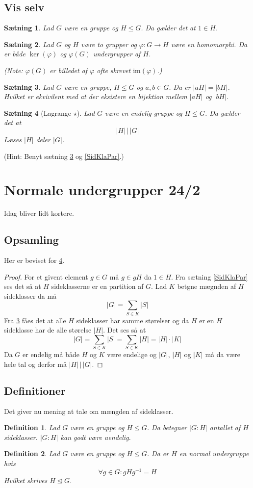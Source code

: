 \documentclass{article}
\newcommand{\inv}{^{-1}}
\newcommand{\too}{\rightarrow}
\newtheorem{setn}{Sætning}
\newtheorem{defi}{Definition}
\begin{document}
		\subsection*{Vis selv}
		\begin{setn}
			Lad $G$ være en gruppe og $H \le G$. Da gælder det at $1 \in H$.
		\end{setn}
		\begin{setn}
			Lad $G$ og $H$ være to grupper og $\varphi: G \too H$ være en homomorphi.
			Da er både $\ker(\varphi)$ og $\varphi(G)$ undergrupper af $H$.
			
			(Note: $\varphi(G)$ er billedet af $\varphi$ ofte skrevet $\text{im}(\varphi)$.)
		\end{setn}
		\begin{setn} \label{SidKlaStø}
			Lad $G$ være en gruppe, $H \le G$ og $a,b \in G$. Da er $|aH| = |bH|$.
			Hvilket er ekvivilent med at der eksistere en bijektion mellem $|aH|$ og $|bH|$.
		\end{setn}
		\begin{setn}[Lagrange $\star$] \label{Lagrange}
			Lad $G$ være en endelig gruppe og $H \le G$. Da gælder det at
			$$|H| \,\Big|\, |G|$$
			Læses $|H|$ deler $|G|$.
		\end{setn}
		(Hint: Benyt sætning \ref{SidKlaStø} og \ref{SidKlaPar}.)
	\newpage
	\section*{Normale undergrupper 24/2}
		Idag bliver lidt kortere.
		\subsection*{Opsamling}
		Her er beviset for \ref{Lagrange}.
		\begin{proof}
			For et givent element $g \in G$ må $g \in gH$ da $1 \in H$.
			Fra sætning \ref{SidKlaPar} ses det så at $H$ sideklasserne
			er en partition af $G$. Lad $K$ betgne mægnden af $H$ sideklasser da må
			$$|G| = \sum_{S \in K} |S|$$
			Fra \ref{SidKlaStø} fåes det at alle $H$ sideklasser har samme størelser og
			da $H$ er en $H$ sideklasse har de alle størelse $|H|$. Det ses så at
			$$|G| = \sum_{S \in K} |S| = \sum_{S \in K} |H| = |H|\cdot |K|$$
			Da $G$ er endelig må både $H$ og $K$ være endelige og $|G|$, $|H|$ og $|K|$
			må da være hele tal og derfor må $|H| \,\Big|\, |G|$.
		\end{proof}
		\subsection*{Definitioner}
		Det giver nu mening at tale om mængden af sideklasser.
		\begin{defi}
			Lad $G$ være en gruppe og $H \le G$. Da betegner $|G:H|$
			antallet af $H$ sideklasser. $|G:H|$ kan godt være uendelig.
		\end{defi}
		\begin{defi}
			Lad $G$ være en gruppe og $H \le G$. Da er $H$ en normal undergruppe hvis
			$$\forall g \in G: gHg\inv = H$$
			Hvilket skrives $H \unlhd G$.
		\end{defi}
\end{document}
